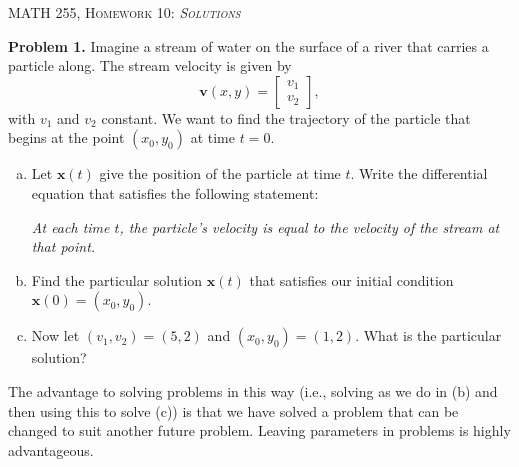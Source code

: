 \documentclass[12pt]{report} %
\theoremstyle{definition}
\begin{document}
\begin{center}
   \textsc{\large MATH 255, Homework 10: \emph{Solutions}}\\
\end{center}
\vspace{.5cm}

\noindent\textbf{Problem 1.} Imagine a stream of water on the surface of a river that carries a particle along. The stream velocity is given by
\[
\mathbf{v}(x,y)=\begin{bmatrix} v_1 \\ v_2 \end{bmatrix},
\]
with $v_1$ and $v_2$ constant. We want to find the trajectory of the particle that begins at the point $(x_0,y_0)$ at time $t=0$.
\begin{enumerate}[(a)]
    \item Let $\mathbf{x}(t)$ give the position of the particle at time $t$. Write the differential equation that satisfies the following statement:
    
    \emph{At each time $t$, the particle's velocity is equal to the velocity of the stream at that point.}
    
    \item Find the particular solution $\mathbf{x}(t)$ that satisfies our initial condition $\mathbf{x}(0)=(x_0,y_0)$.
    
    \item Now let $(v_1,v_2)=(5,2)$ and $(x_0,y_0)=(1,2)$.  What is the particular solution? 
\end{enumerate}
The advantage to solving problems in this way (i.e., solving as we do in (b) and then using this to solve (c)) is that we have solved a problem that can be changed to suit another future problem.  Leaving parameters in problems is highly advantageous.
\end{document}
